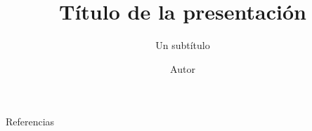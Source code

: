 \documentclass{beamer}
\institute{Nombre de la Institucion \\ \small{Información adicional} }
\title{Título de la presentación}
\subtitle{Un subtítulo}
\author{Autor}
\begin{document}


\begin{frame}{Referencias}

\end{frame}
\end{document}

